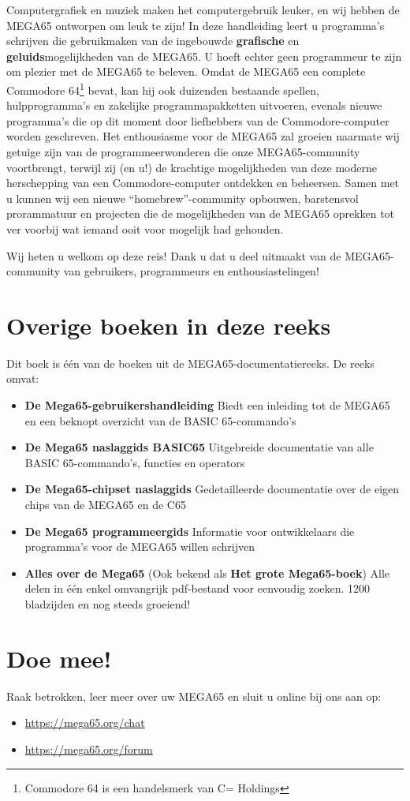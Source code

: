 Computergrafiek en muziek maken het computergebruik leuker, en wij hebben de MEGA65 ontworpen om leuk te zijn! In deze handleiding leert u programma's schrijven die gebruikmaken van de ingebouwde {\bf grafische} en {\bf geluids}mogelijkheden van de MEGA65. U hoeft echter geen programmeur te zijn om plezier met de MEGA65 te beleven. Omdat de MEGA65 een complete Commodore{\textregistered} 64{\texttrademark}\footnote{Commodore 64 is een handelsmerk van C= Holdings} bevat, kan hij ook duizenden bestaande spellen, hulpprogramma's en zakelijke programmapakketten uitvoeren, evenals nieuwe programma's die op dit moment door liefhebbers van de Commodore-computer worden geschreven. Het enthousiasme voor de MEGA65 zal groeien naarmate wij getuige zijn van de programmeerwonderen die onze MEGA65-community voortbrengt, terwijl zij (en u!) de krachtige mogelijkheden van deze moderne herschepping van een Commodore-computer ontdekken en beheersen. Samen met u kunnen wij een nieuwe ``homebrew''-community opbouwen, barstensvol prorammatuur en projecten die de mogelijkheden van de MEGA65 oprekken tot ver voorbij wat iemand ooit voor mogelijk had gehouden.

Wij heten u welkom op deze reis! Dank u dat u deel uitmaakt van de MEGA65-community van gebruikers, programmeurs en enthousiastelingen!

\section{Overige boeken in deze reeks}

Dit boek is één van de boeken uit de MEGA65-documentatiereeks. De reeks omvat:

\begin{itemize}
  \item {\bf De Mega65-gebruikershandleiding} \newline
      Biedt een inleiding tot de MEGA65 en een beknopt overzicht van de BASIC 65-commando's
    \item {\bf De Mega65 naslaggids BASIC65} \newline
      Uitgebreide documentatie van alle BASIC 65-commando's, functies en operators
    \item {\bf De Mega65-chipset naslaggids} \newline
      Gedetailleerde documentatie over de eigen chips van de MEGA65 en de C65
    \item {\bf De Mega65 programmeergids} \newline
      Informatie voor ontwikkelaars die programma's voor de MEGA65 willen schrijven
    \item {\bf Alles over de Mega65} \newline
      (Ook bekend als {\bf Het grote Mega65-boek}) \newline
      Alle delen in één enkel omvangrijk pdf-bestand voor eenvoudig zoeken. 1200 bladzijden en nog steeds groeiend!
\end{itemize}

\section{Doe mee!}Raak betrokken, leer meer over uw MEGA65 en sluit u online bij ons aan op:

\begin{itemize}
    \item \url{https://mega65.org/chat}
    \item \url{https://mega65.org/forum}
\end{itemize}
